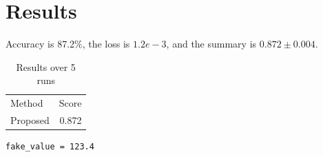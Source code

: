 \section{Results}
Accuracy is 87.2\%, the loss is $1.2e-3$, and the summary is $0.872 \pm 0.004$.
\begin{table}
\caption{Results over 5 runs}
\begin{tabular}{lr}
Method & Score \\
Proposed & 0.872 \\
\end{tabular}
\end{table}
\begin{verbatim}
fake_value = 123.4
\end{verbatim}
